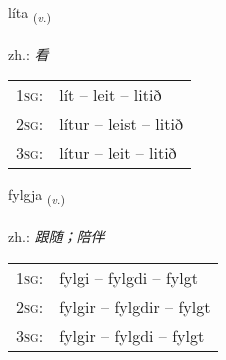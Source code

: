 \documentclass[frontgrid, backgrid]{flacards}\usepackage[]{graphicx}\usepackage[]{xcolor}
\begin{document}
{líta \small{\textsubscript{(\textit{v.})}} \\[1ex] %
\textphonetic{[liːta]} \\
zh.: \emph{看} \\  [2ex]
\renewcommand*{\arraystretch}{0.8}
\begin{tabular}{p{1cm}l}
\textsc{1sg}: & lít -- leit -- litið \\ 
\textsc{2sg}: & lítur -- leist -- litið \\ 
\textsc{3sg}: & lítur -- leit -- litið \\ 
\end{tabular}
}

\renewcommand{\flhead}{\vskip5pt \fboxsep=0pt {\small\bfseries\footnotesize Sagnorð | 动词}}
\renewcommand{\fcfoot}{\vskip5pt \fboxsep=0pt \hspace{2pt}{\small\bfseries\footnotesize 1K}}

\renewcommand{\blhead}{\vskip5pt {\small\bfseries\footnotesize Sagnorð | 动词 }}
\renewcommand{\bcfoot}{\vskip5pt \hspace{2pt}{\small\bfseries\footnotesize 1K}}


{fylgja \small{\textsubscript{(\textit{v.})}} \\[1ex] %
\textphonetic{[fɪlca]} \\
zh.: \emph{跟随；陪伴} \\  [2ex]
\renewcommand*{\arraystretch}{0.8}
\begin{tabular}{p{1cm}l}
\textsc{1sg}: & fylgi -- fylgdi -- fylgt \\ 
\textsc{2sg}: & fylgir -- fylgdir -- fylgt \\ 
\textsc{3sg}: & fylgir -- fylgdi -- fylgt \\ 
\end{tabular}
}

\renewcommand{\flhead}{\vskip5pt \fboxsep=0pt {\small\bfseries\footnotesize Nafnorð | 名词}}
\renewcommand{\fcfoot}{\vskip5pt \fboxsep=0pt \hspace{2pt}{\small\bfseries\footnotesize 1K}}
\end{document}
